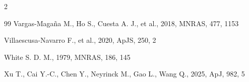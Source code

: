\documentclass[11pt,a4paper]{article}
\begin{document}
\begin{multicols}{2}
\begin{thebibliography}{99}
Vargas-Maga\~na M., Ho S., Cuesta A. J., et al., 2018, MNRAS, 477, 1153

Villaescusa-Navarro F., et al., 2020, ApJS, 250, 2

White S. D. M., 1979, MNRAS, 186, 145

Xu T., Cai Y.-C., Chen Y., Neyrinck M., Gao L., Wang Q., 2025, ApJ, 982, 5

\end{thebibliography}
\end{multicols}
\end{document}
